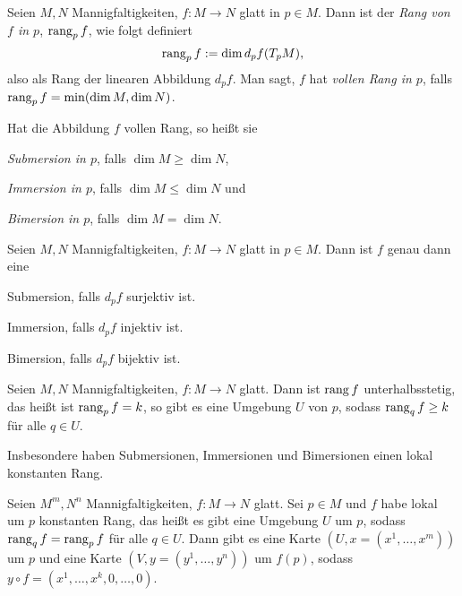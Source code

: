 \begin{definition}
  Seien $M,N$ Mannigfaltigkeiten, $f\colon M \to N$ glatt in $p\in
  M$. Dann ist der \emph{Rang von $f$ in $p$}, $\operatorname{rang}_p f$, wie folgt definiert
  \begin{equation*}
    \operatorname{rang}_p f := \dim d_pf(T_pM),
  \end{equation*}
  also als Rang der linearen Abbildung $d_pf$. Man sagt, $f$ hat
  \emph{vollen Rang in $p$}, falls $\operatorname{rang}_p f = \min(\dim M,\dim N)$.

  Hat die Abbildung $f$ vollen Rang, so heißt sie
  \begin{statements}
  \item \emph{Submersion in $p$}, falls  $\dim M \geq \dim N$,
  \item \emph{Immersion in $p$}, falls $\dim M \leq \dim N$ und
  \item \emph{Bimersion in $p$}, falls $\dim M = \dim N$.
  \end{statements}
\end{definition}

\begin{proposition}
  Seien $M,N$ Mannigfaltigkeiten, $f\colon M \to N$ glatt in $p\in
  M$. Dann ist $f$ genau dann eine
  \begin{statements}
  \item Submersion, falls $d_pf$ surjektiv ist.
  \item Immersion, falls $d_pf$ injektiv ist.
  \item Bimersion, falls $d_pf$ bijektiv ist.
  \end{statements}
\end{proposition}

\begin{proposition}
  Seien $M,N$ Mannigfaltigkeiten, $f\colon M \to N$ glatt. Dann ist
  $\operatorname{rang} f$ unterhalbsstetig, das heißt ist $\operatorname{rang}_p f = k$, so gibt es
  eine Umgebung $U$ von $p$, sodass $\operatorname{rang}_q f \geq k$ für alle $q\in
  U$.

  Insbesondere haben Submersionen, Immersionen und Bimersionen einen
  lokal konstanten Rang.
\end{proposition}

\begin{satz}
  Seien $M^m,N^n$ Mannigfaltigkeiten, $f\colon M \to N$ glatt. Sei $p\in
  M$ und $f$ habe lokal um $p$ konstanten Rang, das heißt es gibt eine
  Umgebung $U$ um $p$, sodass $\operatorname{rang}_qf = \operatorname{rang}_pf$ für alle $q\in
  U$. Dann gibt es eine Karte $(U,x=(x^1,\dots,x^m))$ um $p$ und eine
  Karte $(V,y=(y^1,\dots,y^n))$ um $f(p)$, sodass $y\circ f = (x^1,\dots,x^k,0,\dots,0)$.
\end{satz}

